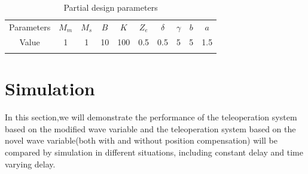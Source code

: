 \begin{table}[htp]%
    \centering
    \caption{Partial design parameters}
    \label{tab1}
    \begin{tabular}{ccccc ccccc}%
        \hline\hline\noalign{\smallskip}
        Parameters & $M_m$ & $M_s$ & $B$ & $K$ & $Z_e$ & $\delta$ & $\gamma$ & $b$ & $a$ \\
        \noalign{\smallskip}\hline\noalign{\smallskip}
        Value      & 1     & 1     & 10  & 100 & 0.5   & 0.5      & 5        & 5   & 1.5 \\
        \noalign{\smallskip}\hline
    \end{tabular}
\end{table}




\section{Simulation}
In this section,we will demonstrate
the performance of the teleoperation system based on the modified wave variable
and the teleoperation system based on the novel wave variable(both with and without position compensation)
will be compared by simulation in different situations,
including constant delay and time varying delay.


